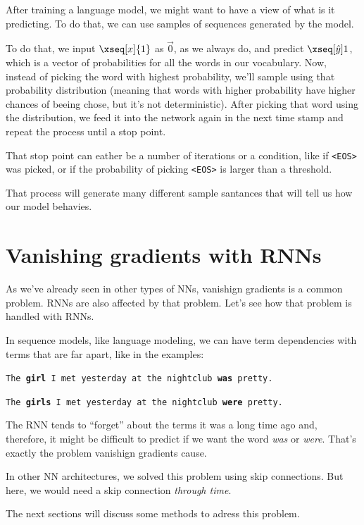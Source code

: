 \documentclass[12pt, a4paper, oneside]{book}
\begin{document}
After training a language model, we might want to have a view of what is it
predicting. To do that, we can use samples of sequences generated by the model.

To do that, we input $\xseq[x]{1}$ as $\vec{0}$, as we always do, and predict
$\xseq[\hat{y}]{1}$, which is a vector of probabilities for all the words in our
vocabulary. Now, instead of picking the word with highest probability, we'll
sample using that probability distribution (meaning that words with higher
probability have higher chances of beeing chose, but it's not deterministic).
After picking that word using the distribution, we feed it into the network
again in the next time stamp and repeat the process until a stop point.

That stop point can eather be a number of iterations or a condition, like if
\texttt{<EOS>} was picked, or if the probability of picking \texttt{<EOS>} is
larger than a threshold.

That process will generate many different sample santances that will tell us how
our model behavies.

\section{Vanishing gradients with RNNs}%
\label{sec:vanishing_gradients_with_rnns}

As we've already seen in other types of NNs, vanishign gradients is a common
problem. RNNs are also affected by that problem. Let's see how that problem is
handled with RNNs.

In sequence models, like language modeling, we can have term dependencies with
terms that are far apart, like in the examples: \jump

\texttt{The \textbf{girl} I met yesterday at the nightclub \textbf{was} pretty.}

\texttt{The \textbf{girls} I met yesterday at the nightclub \textbf{were} pretty.}
\jump

The RNN tends to ``forget'' about the terms it was a long time ago and,
therefore, it might be difficult to predict if we want the word \textit{was} or
\textit{were}. That's exactly the problem vanishign gradients cause.

In other NN architectures, we solved this problem using skip connections. But
here, we would need a skip connection \textit{through time}. \jump

The next sections will discuss some methods to adress this problem.
\end{document}
